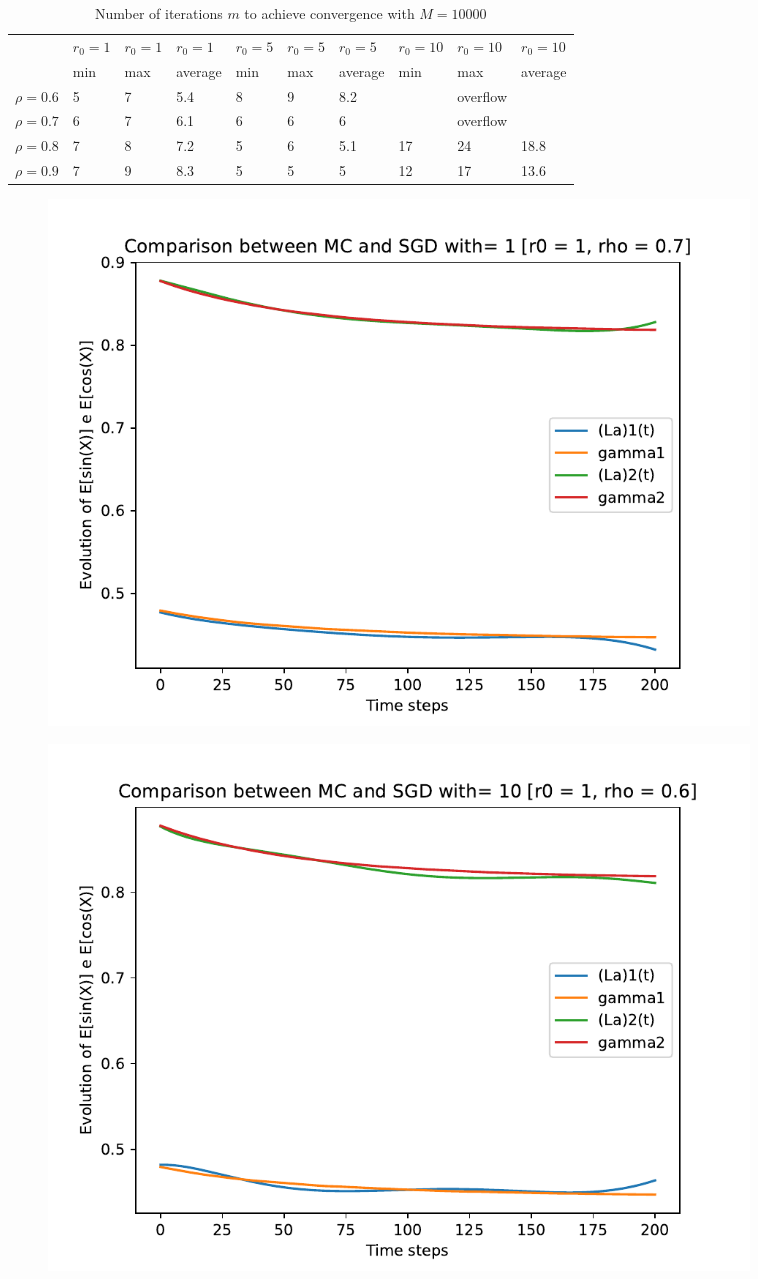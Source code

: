 \documentclass[a4paper,11pt,openright]{report}
\begin{document}
\begin{table}[H]
\centering
\addtolength{\leftskip}{-1.5cm}
\addtolength{\rightskip}{-1.5cm}
\begin{tabular}{|c|lllllllll|}
\hline
$ $ & $r_0 = 1$ & $r_0 = 1$ & $r_0 = 1$ & $r_0 = 5$ & $r_0 = 5$ & $r_0 = 5$ & $r_0 = 10$ & $r_0 = 10$ & $r_0 = 10$  \\
$ $ & min & max & average & min & max & average & min & max & average \\ 
\hline
$\rho = 0.6$ & 5 & 7 & 5.4 & 8 & 9 & 8.2 &  & overflow &  \\

$\rho = 0.7$ & 6 & 7 & 6.1 & 6 & 6 & 6 &  & overflow &  \\

$\rho = 0.8$ & 7 & 8 & 7.2 & 5 & 6 & 5.1 & 17 & 24 & 18.8 \\

$\rho = 0.9$ & 7 & 9 & 8.3 & 5 & 5 & 5 & 12 & 17 & 13.6\\
\hline
\end{tabular}
\caption{Number of iterations $m$ to achieve convergence with $M = 10000$}
\end{table}
\begin{figure}[H]
\centering
\includegraphics[width=0.9\textwidth]{images/graphics T = 2/n = 6, M = 1 sine and cosine.pdf}
\end{figure}
\begin{figure}[H]
\centering
\includegraphics[width=0.9\textwidth]{images/graphics T = 2/n = 6, M = 10 sine and cosine.pdf}
\end{figure}
\end{document}
